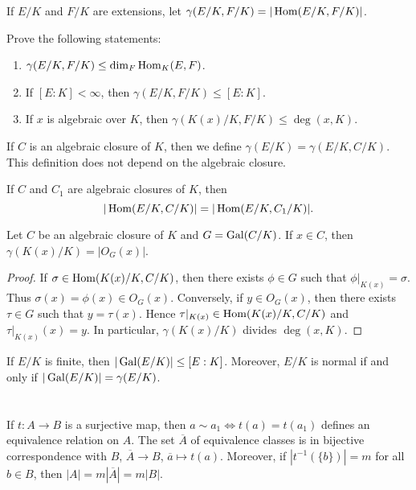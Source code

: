 If $E/K$ and $F/K$ are extensions, 
let $\gamma(E/K,F/K)=|\operatorname{Hom}(E/K,F/K)|$. 

\begin{exercise}
Prove the following statements:
\begin{enumerate}
    \item $\gamma(E/K,F/K)\leq\dim_F\operatorname{Hom}_K(E,F)$.
    \item If $[E:K]<\infty$, then $\gamma(E/K,F/K)\leq[E:K]$. 
    \item If $x$ is algebraic over $K$, then $\gamma(K(x)/K,F/K)\leq\deg(x,K)$.
\end{enumerate}
\end{exercise}

If $C$ is an algebraic closure of $K$,
then we define $\gamma(E/K)=\gamma(E/K,C/K)$. This definition does
not depend on the algebraic closure. 

\begin{exercise}
\label{xca:gamma_C}
    If $C$ and $C_1$ are algebraic closures of $K$, then
    \[
    |\operatorname{Hom}(E/K,C/K)|=|\operatorname{Hom}(E/K,C_1/K)|.
    \]
\end{exercise}

\begin{proposition}
\label{pro:gamma_orbit}
    Let $C$ be an algebraic closure of $K$ and $G=\operatorname{Gal}(C/K)$. 
    If $x\in C$, then $\gamma(K(x)/K)=|O_G(x)|$. 
\end{proposition}

\begin{proof}
    If $\sigma\in\operatorname{Hom}(K(x)/K,C/K)$, then there exists $\phi\in G$ such that
    $\phi|_{K(x)}=\sigma$. Thus $\sigma(x)=\phi(x)\in O_G(x)$. Conversely,
    if $y\in O_G(x)$, then there exists $\tau\in G$ such that
    $y=\tau(x)$. Hence $\tau|_{K(x)}\in\operatorname{Hom}(K(x)/K,C/K)$ and 
    $\tau|_{K(x)}(x)=y$. In particular, $\gamma(K(x)/K)$ divides $\deg(x,K)$. 
\end{proof}


\begin{exercise}
If $E/K$ is finite, then $|\operatorname{Gal}(E/K)|\leq [E:K]$. Moreover, 
$E/K$ is normal if and only if $|\operatorname{Gal}(E/K)|=\gamma(E/K)$. 
\end{exercise}

\chapter{}

If $t\colon A\to B$ is a surjective map, then 
$a\sim a_1\Longleftrightarrow t(a)=t(a_1)$ 
defines an equivalence relation on $A$. The set $\overline{A}$ 
of equivalence classes is in bijective correspondence with $B$,
$\overline{A}\to B$, $\overline{a}\mapsto t(a)$. 
Moreover, if $|t^{-1}(\{b\})|=m$ for all $b\in B$, then 
$|A|=m|\overline{A}|=m|B|$. 

